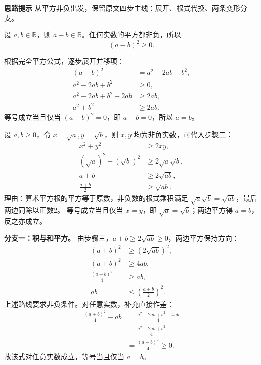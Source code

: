 \begin{proofbox}
\textbf{\textcolor{CProof}{思路提示}} 从平方非负出发，保留原文四步主线：展开、根式代换、两条变形分支。
\begin{description}[style=nextline,leftmargin=2.8em,labelsep=.5em,itemsep=.55em]
\item[\textbf{步骤一（平方差非负）：}]
设 $a,b\in\mathbb R$，则 $a-b\in\mathbb R$。任何实数的平方都非负，所以
\[(a-b)^2\ge0.\]
\item[\textbf{步骤二（展开得基础式）：}]
根据完全平方公式，逐步展开并移项：
\begin{align*}(a-b)^2&=a^2-2ab+b^2,\\
a^2-2ab+b^2&\ge0,\\
a^2-2ab+b^2+2ab&\ge 2ab,\\
a^2+b^2&\ge2ab.\end{align*}
等号成立当且仅当 $(a-b)^2=0$，即 $a-b=0$，所以 $a=b$。
\item[\textbf{步骤三（特化到非负实数）：}]
设 $a,b\ge0$，令 $x=\sqrt a,y=\sqrt b$，则 $x,y$ 均为非负实数，可代入步骤二：
\begin{align*}x^2+y^2&\ge2xy,\\
(\sqrt a)^2+(\sqrt b)^2&\ge2\sqrt a\sqrt b,\\
a+b&\ge2\sqrt{ab},\\
\frac{a+b}{2}&\ge\sqrt{ab}.\end{align*}
理由：算术平方根的平方等于原数，非负数的根式乘积满足 $\sqrt a\sqrt b=\sqrt{ab}$，最后两边同除以正数2。
等号成立当且仅当 $x=y$，即 $\sqrt a=\sqrt b$；两边平方得 $a=b$，反之亦成立。
\item[\textbf{步骤四（变形得其他形式）：}]
\textbf{分支一：积与和平方。} 由步骤三，$a+b\ge2\sqrt{ab}\ge0$，两边平方保持方向：
\begin{align*}(a+b)^2&\ge(2\sqrt{ab})^2,\\
(a+b)^2&\ge4ab,\\
\frac{(a+b)^2}{4}&\ge ab,\\
ab&\le\left(\frac{a+b}{2}\right)^2.\end{align*}
上述路线要求非负条件。对任意实数，补充直接作差：
\begin{align*}\frac{(a+b)^2}{4}-ab&=\frac{a^2+2ab+b^2-4ab}{4}\\
&=\frac{a^2-2ab+b^2}{4}\\&=\frac{(a-b)^2}{4}\ge0.\end{align*}
故该式对任意实数成立，等号当且仅当 $a=b$。


\end{description}
\end{proofbox}
